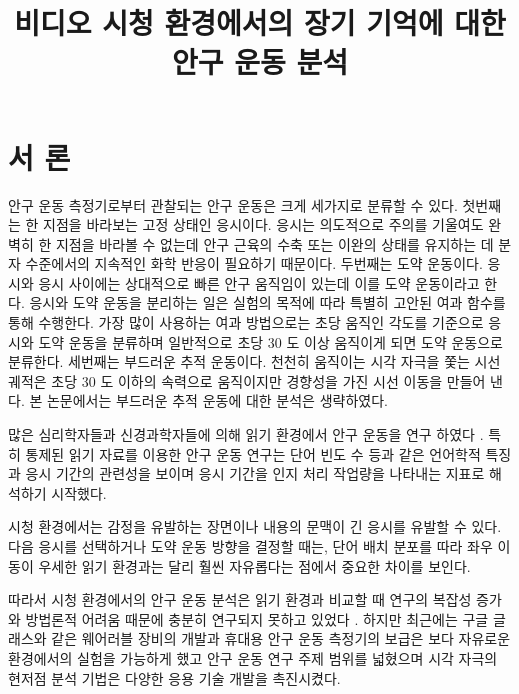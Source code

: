 \documentclass{kcc}
\title{비디오 시청 환경에서의 장기 기억에 대한 안구 운동 분석}
\author{
}
\begin{document}
\maketitle


\section{서 론}

안구 운동 측정기로부터 관찰되는 안구 운동은 크게 세가지로 분류할 수 있다. 첫번째는 한 지점을 바라보는 고정 상태인 응시이다. 응시는 의도적으로 주의를 기울여도 완벽히 한 지점을 바라볼 수 없는데 안구 근육의 수축 또는 이완의 상태를 유지하는 데 분자 수준에서의 지속적인 화학 반응이 필요하기 때문이다. 두번째는 도약 운동이다. 응시와 응시 사이에는 상대적으로 빠른 안구 움직임이 있는데 이를 도약 운동이라고 한다. 응시와 도약 운동을 분리하는 일은 실험의 목적에 따라 특별히 고안된 여과 함수를 통해 수행한다. 가장 많이 사용하는 여과 방법으로는 초당 움직인 각도를 기준으로 응시와 도약 운동을 분류하며 일반적으로 초당 30 도 이상 움직이게 되면 도약 운동으로 분류한다. 세번째는 부드러운 추적 운동이다. 천천히 움직이는 시각 자극을 쫓는 시선 궤적은 초당 30 도 이하의 속력으로 움직이지만 경향성을 가진 시선 이동을 만들어 낸다. 본 논문에서는 부드러운 추적 운동에 대한 분석은 생략하였다.

많은 심리학자들과 신경과학자들에 의해 읽기 환경에서 안구 운동을 연구 하였다 \cite{Rayner1998,Reichle1998}. 특히 통제된 읽기 자료를 이용한 안구 운동 연구\cite{Inhoff1986,Rayner1986}는 단어 빈도 수 등과 같은 언어학적 특징과 응시 기간의 관련성을 보이며 응시 기간을 인지 처리 작업량을 나타내는 지표로 해석하기 시작했다. 

시청 환경에서는 감정을 유발하는 장면이나 내용의 문맥이 긴 응시를 유발할 수 있다. 다음 응시를 선택하거나 도약 운동 방향을 결정할 때는, 단어 배치 분포를 따라 좌우 이동이 우세한 읽기 환경과는 달리 훨씬 자유롭다는 점에서 중요한 차이를 보인다.

따라서 시청 환경에서의 안구 운동 분석은 읽기 환경과 비교할 때 연구의 복잡성 증가\cite{Choe2013}와 방법론적 어려움 때문에 충분히 연구되지 못하고 있었다 \cite{Tatler2011}. 하지만 최근에는 구글 글래스와 같은 웨어러블 장비의 개발과 휴대용 안구 운동 측정기의 보급은 보다 자유로운 환경에서의 실험을 가능하게 했고 안구 운동 연구 주제 범위를 넓혔으며 시각 자극의 현저점 분석 기법\cite{itti1998model}은 다양한 응용 기술 개발을 촉진시켰다. 
\end{document}
